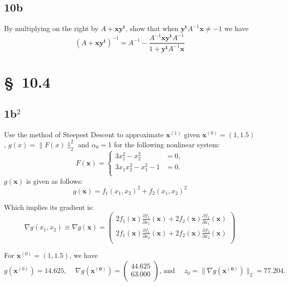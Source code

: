 \documentclass[12pt]{article}
\begin{document}
\newpage
\subsection{10b}
By multiplying on the right by $A + \mathbf{x y^{t}}$, show that when
$\mathbf{y^{t}} A^{-1} \mathbf{x} \ne -1$ we have
\begin{equation*}
  \label{eq:10b}
  (A+\mathbf{x y^{t}})^{-1} = A^{-1} - \frac{A^{-1} \mathbf{x y^{t}} A^{-1}}{1+\mathbf{y^{t}}A^{-1}\mathbf{x}}
\end{equation*}

\section{\S~10.4}
\subsection{1b$^2$}
Use the method of Steepest Descent to approximate $\mathbf{x}^{(1)}$
given $\mathbf{x}^{(0)}=(1,1.5)$, $g(x)=\|F(x)\|_2^2$ and $\alpha_0=1$
for the following nonlinear system:
\begin{equation*}
  \label{eq:stp_F}
  F(\mathbf{x}) = \left\{
    \begin{aligned}
      3x_1^2-x_2^2&=0, \\
      3x_1x_2^2-x_1^2-1&=0. \\
    \end{aligned}
  \right.
\end{equation*}
$g(\mathbf{x})$ is given as follows:
\begin{equation}
  \label{eq:stp_g}
  g(\mathbf{x}) = f_1(x_1,x_2)^2+f_2(x_1,x_2)^2
\end{equation}

Which implies its gradient is:
\begin{equation}
  \label{eq:stp_nabg}
  \nabla g(x_1,x_2) \equiv \nabla g(\mathbf{x}) = 
  \begin{pmatrix}
    2f_1(\mathbf{x})\frac{\partial f_1}{\partial x_1}(\mathbf{x}) + 2f_2(\mathbf{x})\frac{\partial f_2}{\partial x_1}(\mathbf{x}) \\
    2f_1(\mathbf{x})\frac{\partial f_1}{\partial x_2}(\mathbf{x}) + 2f_2(\mathbf{x})\frac{\partial f_2}{\partial x_2}(\mathbf{x}) \\
  \end{pmatrix}
\end{equation}

For $\mathbf{x}^{(0)}=(1,1.5)$, we have 
\begin{equation*}
  g(\mathbf{x}^{(0)}) = 14.625 \text{, } \quad
  \nabla g(\mathbf{x^{(0)}}) =
  \begin{pmatrix}
    44.625 \\
    63.000 \\
  \end{pmatrix} \text{, and } \quad
  z_0=\|\nabla g(\mathbf{x^{(0)}})\|_2 = 77.204
.
\end{equation*}
\end{document}
